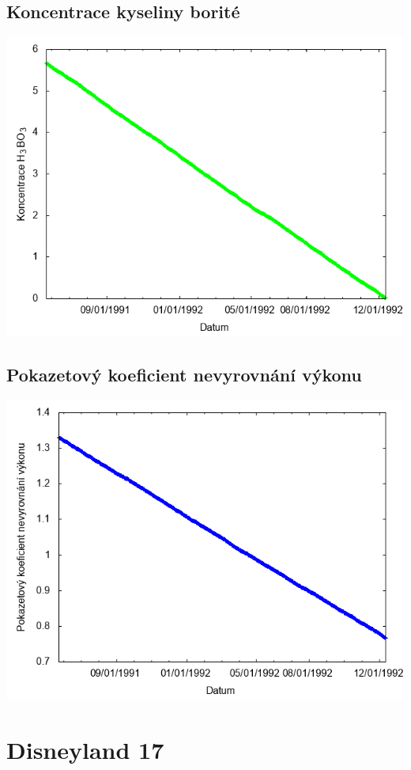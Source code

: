 \documentclass[a4paper,twoside,11pt]{article}
\begin{document}
\subsection*{Koncentrace kyseliny borité}
\begin{center}
\includegraphics[width=.8\textwidth]{graphs/Disneyland_16_bc.png}
\end{center}

\subsection*{Pokazetový koeficient nevyrovnání výkonu}
\begin{center}
\includegraphics[width=.8\textwidth]{graphs/Disneyland_16_fha.png}
\end{center}

\newpage
\section*{Disneyland 17}
\end{document}
